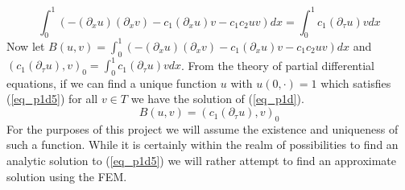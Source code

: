 \documentclass[11pt,fleqn]{article}
\theoremstyle{defstyle}
\begin{document}
\begin{equation}
\int_0^1 (-(\partial_xu)(\partial_xv) - c_1(\partial_xu)v - c_1c_2uv)dx = \int^1_0 c_1(\partial_{\tau}u)v dx
\label{eq_p1d4}
\end{equation}
Now let $B(u, v) = \int_0^1 (-(\partial_xu)(\partial_xv) - c_1(\partial_xu)v - c_1c_2uv)dx$ and $(c_1(\partial_{\tau}u),v)_0 = \int^1_0 c_1(\partial_{\tau}u)v dx$. From the theory of partial differential equations, if we can find a unique function $u$ with $u(0, \cdot)=1$ which satisfies (\ref{eq_p1d5}) for all $v \in T$ we have the solution of (\ref{eq_p1d}).
\begin{equation}
B(u, v) = (c_1(\partial_{\tau}u),v)_0
\label{eq_p1d5}
\end{equation}
For the purposes of this project we will assume the existence and uniqueness of such a function. While it is certainly within the realm of possibilities to find an analytic solution to (\ref{eq_p1d5}) we will rather attempt to find an approximate solution using the FEM.
\end{document}
